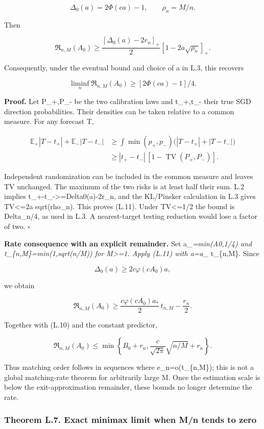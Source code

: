 \[
\Delta_0(a)=2\Phi(ca)-1,\qquad \rho_n=M/n.
\]

Then

\[
\mathfrak R_{n,M}(A_0)
\ge \frac{[\Delta_0(a)-2r_n]_+}{2}
       [1-2a\sqrt{\rho_n}]_+.
\tag{L.11}
\]

Consequently, under the eventual bound and choice of a in L.3, this
recovers

\[
\liminf_n\mathfrak R_{n,M}(A_0)
\ge [2\Phi(ca)-1]/4.
\tag{L.12}
\]

\textbf{Proof.} Let P\_+,P\_- be the two calibration laws and t\_+,t\_-
their true SGD direction probabilities. Their densities can be taken
relative to a common measure. For any forecast T,

\[
\begin{aligned}
\mathbb E_+|T-t_+|+\mathbb E_-|T-t_-|
&\ge\int\min(p_+,p_-)\bigl(|T-t_+|+|T-t_-|\bigr)\\
&\ge |t_+-t_-|\,[1-\operatorname{TV}(P_+,P_-)].
\end{aligned}
\]

Independent randomization can be included in the common measure and
leaves TV unchanged. The maximum of the two risks is at least half their
sum. L.2 implies \textbar t\_+-t\_-\textbar\textgreater=Delta0(a)-2r\_n,
and the KL/Pinsker calculation in L.3 gives TV\textless=2a sqrt(rho\_n).
This proves (L.11). Under TV\textless=1/2 the bound is Delta\_n/4, as
used in L.3. A nearest-target testing reduction would lose a factor of
two. \(\square\)

\textbf{Rate consequence with an explicit remainder.} Set
a\_\emph{=min(A0,1/4) and t\_\{n,M\}=min(1,sqrt(n/M)) for
M\textgreater=1. Apply (L.11) with a=a\_} t\_\{n,M\}. Since

\[
\Delta_0(a)\ge 2c\varphi(cA_0)a,
\]

we obtain

\[
\mathfrak R_{n,M}(A_0)
\ge \frac{c\varphi(cA_0)a_*}{2}\,t_{n,M}-\frac{r_n}{2}.
\tag{L.13}
\]

Together with (L.10) and the constant predictor,

\[
\mathfrak R_{n,M}(A_0)
\le\min\left\{B_0+r_n,
\frac{c}{\sqrt{2\pi}}\sqrt{n/M}+r_n\right\}.
\tag{L.14}
\]

Thus matching order follows in sequences where e\_n=o(t\_\{n,M\}); this
is not a global matching-rate theorem for arbitrarily large M. Once the
estimation scale is below the exit-approximation remainder, these bounds
no longer determine the rate.

\subsubsection{Theorem L.7. Exact minimax limit when M/n tends to
zero}\label{local_prediction-theorem-l.7.-exact-minimax-limit-when-mn-tends-to-zero}

